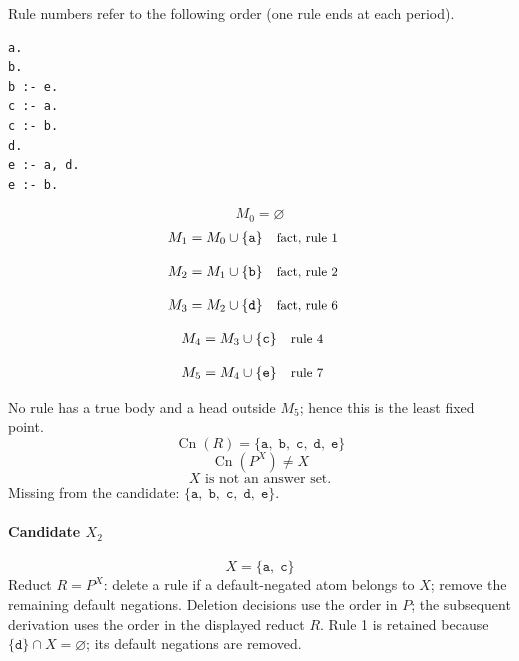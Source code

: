 \documentclass[a4paper,11pt]{article}
\newif\ifexplain
\newcommand{\explain}[1]{\ifexplain\begin{erklbox}#1\end{erklbox}\fi}
\newcommand{\why}[1]{\text{\small #1}}
\newcommand{\at}[1]{\texttt{#1}}
\begin{document}
Rule numbers refer to the following order (one rule ends at each period).
\begin{small}
\begin{verbatim}
a.
b.
b :- e.
c :- a.
c :- b.
d.
e :- a, d.
e :- b.
\end{verbatim}
\end{small}
\explain{Beim Redukt bleibt die Kandidatenmenge fest. Wir entscheiden zuerst, welche Regeln wegfallen. Erst danach berechnen wir aus den verbleibenden positiven Regeln die kleinste abgeschlossene Menge. Ein Modell allein reicht nicht: Diese Menge muss genau der Kandidat sein.}
\[
M_0=\varnothing
\]
\begin{align*}
M_{1} &= M_{0}\cup \{\at{a}\} && \why{fact, rule 1}
\end{align*}
\explain{Diese Regel hat keinen Körper. Ihr Kopf $\at{a}$ ist damit ein Fakt und muss in die Menge.}
\begin{align*}
M_{2} &= M_{1}\cup \{\at{b}\} && \why{fact, rule 2}
\end{align*}
\explain{Diese Regel hat keinen Körper. Ihr Kopf $\at{b}$ ist damit ein Fakt und muss in die Menge.}
\begin{align*}
M_{3} &= M_{2}\cup \{\at{d}\} && \why{fact, rule 6}
\end{align*}
\explain{Diese Regel hat keinen Körper. Ihr Kopf $\at{d}$ ist damit ein Fakt und muss in die Menge.}
\begin{align*}
M_{4} &= M_{3}\cup \{\at{c}\} && \why{rule 4}
\end{align*}
\explain{Für $\at{c}$ brauchen wir $\at{a}$. Weil diese Voraussetzungen bereits hergeleitet sind, dürfen wir den Regelkopf jetzt aufnehmen und alle bisherigen Atome behalten; bei einer fehlenden Voraussetzung würde diese Regel dagegen noch nichts beitragen.}
\begin{align*}
M_{5} &= M_{4}\cup \{\at{e}\} && \why{rule 7}
\end{align*}
\explain{Für $\at{e}$ brauchen wir $\at{a}$ und $\at{d}$. Weil diese Voraussetzungen bereits hergeleitet sind, dürfen wir den Regelkopf jetzt aufnehmen und alle bisherigen Atome behalten; bei einer fehlenden Voraussetzung würde diese Regel dagegen noch nichts beitragen.}
No rule has a true body and a head outside $M_{5}$; hence this is the least fixed point.
\[
\operatorname{Cn}(R)=\{\at{a},\;\at{b},\;\at{c},\;\at{d},\;\at{e}\}
\]
\[
\operatorname{Cn}(P^X)\ne X
\]
\[
\boxed{X\text{ is not an answer set.}}
\]
Missing from the candidate: $\{\at{a},\;\at{b},\;\at{c},\;\at{d},\;\at{e}\}$.
\paragraph{Candidate $X_2$}
\[
X=\{\at{a},\;\at{c}\}
\]
Reduct $R=P^X$: delete a rule if a default-negated atom belongs to $X$; remove the remaining default negations. Deletion decisions use the order in $P$; the subsequent derivation uses the order in the displayed reduct $R$.
Rule 1 is retained because $\{\at{d}\}\cap X=\varnothing$; its default negations are removed.
\end{document}
